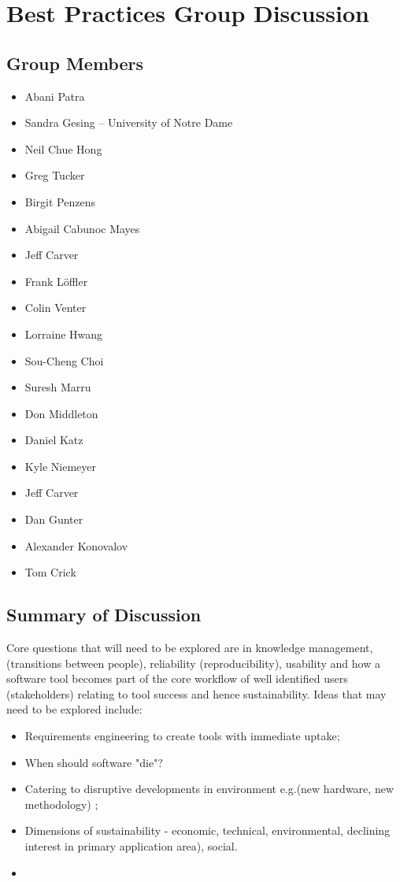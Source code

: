 \section{Best Practices Group Discussion}
\label{sec:appendix_best_practices}


\subsection{Group Members}

\begin{itemize}
\item Abani Patra 
\item Sandra Gesing -- University of Notre Dame
\item Neil Chue Hong 
\item Greg Tucker 
\item Birgit Penzens 
\item Abigail Cabunoc Mayes 
\item Jeff Carver 
\item Frank L\"offler 
\item Colin Venter 
\item Lorraine Hwang 
\item Sou-Cheng Choi
\item Suresh Marru 
\item Don Middleton 
\item Daniel Katz  
\item Kyle Niemeyer 
\item Jeff Carver 
\item Dan Gunter 
\item Alexander Konovalov 
\item Tom Crick 

\end{itemize}

\subsection{Summary of Discussion}
Core questions that will need to be explored are in knowledge management, 
(transitions between people), reliability (reproducibility), usability and how a software tool becomes part of the core workflow of well identified users (stakeholders)
relating to tool success and hence sustainability. Ideas 
that may need to be explored include:
\begin{itemize}
\item Requirements engineering to create tools with immediate uptake;
\item When should software "die"?
\item Catering to disruptive developments in environment e.g.(new hardware, new methodology) ;
\item Dimensions of sustainability - economic, technical, environmental, 
declining interest in primary application area), social.
\item 
\end{itemize}

